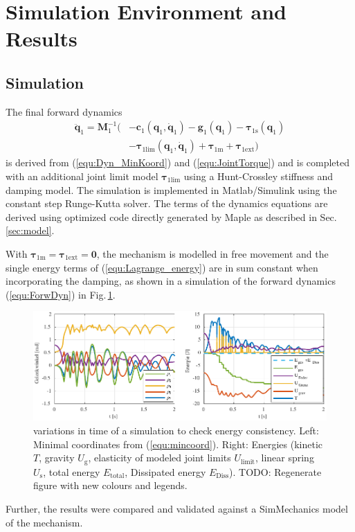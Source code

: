 \documentclass[letterpaper, 10 pt, conference]{ieeeconf}  %
\newcommand{\bm}[1]{\boldsymbol{#1}}
\begin{document}
\section{Simulation Environment and Results}
\label{sec:simulation}

\subsection{Simulation}

The final forward dynamics
\begin{align}
\ddot{\bm{q}}_1 = \bm{M}_1^{-1}( &-\bm{c}_1(\bm{q}_1,\dot{\bm{q}}_1)-\bm{g}_1(\bm{q}_1) -\bm{\tau}_{1\mathrm{s}}(\bm{q}_1) \nonumber \\
& - \bm{\tau}_{1\mathrm{lim}}(\bm{q}_1,\dot{\bm{q}}_1)  + \bm{\tau}_{1\mathrm{m}} + \bm{\tau}_{1\mathrm{ext}})
\label{equ:ForwDyn}
\end{align}
is derived from (\ref{equ:Dyn_MinKoord}) and (\ref{equ:JointTorque}) and is completed with an additional joint limit model $\bm{\tau}_{1\mathrm{lim}}$ using a Hunt-Crossley stiffness and damping model.
The simulation is implemented in Matlab/Simulink using the constant step Runge-Kutta solver.
The terms of the dynamics equations are derived using optimized code directly generated by Maple as described in Sec.\,\ref{sec:model}.

With ${\bm{\tau}_{1\mathrm{m}} = \bm{\tau}_{1\mathrm{ext}} = \bm{0}}$, the mechanism is modelled in free movement and the single energy terms of (\ref{equ:Lagrange_energy}) are in sum constant when incorporating the damping, as shown in a simulation of the forward dynamics (\ref{equ:ForwDyn}) in Fig.\,\ref{fig:SimulationEnergiekonsistenz}.
%
\begin{figure}[htb!]
    \includegraphics{figures/KAS5m5_Gelenkgrenzmodell_q_E.pdf} 
    \caption{variations in time of a simulation to check energy consistency. Left: Minimal coordinates from (\ref{equ:mincoord}). Right: Energies (kinetic $T$, gravity $U_\mathrm{g}$, elasticity of modeled joint limits $U_\mathrm{limit}$, linear spring $U_\mathrm{s}$, total energy $E_\mathrm{total}$, Dissipated energy $E_\mathrm{Diss}$). TODO: Regenerate figure with new colours and legends.}
    \label{fig:SimulationEnergiekonsistenz}
\end{figure} 
%
Further, the results were compared and validated against a SimMechanics model of the mechanism.
\end{document}

